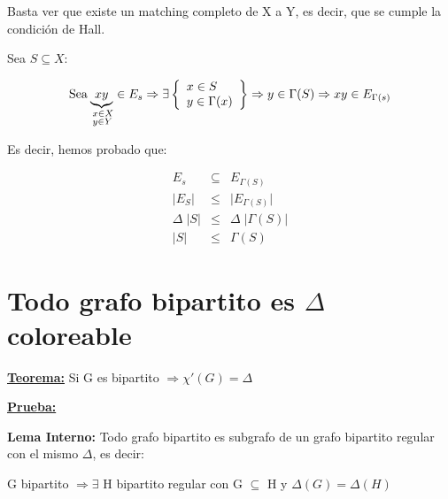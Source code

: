 \documentclass[12pt,a4paper]{report}
\begin{document}
			\vspace{3mm}
			\par Basta ver que existe un matching completo de X a Y, es decir, que se cumple la condición de Hall.

			\vspace{5mm}
			\par Sea $S \subseteq X$:

			\begin{equation*}
				\text{Sea}
				\underbrace{xy}_{\begin{subarray}{l} \; x \in X \\
				\; y \in Y \end{subarray}} \in E_{s} \Rightarrow
				{\Huge \exists}
	  		\left\lbrace
	  		\begin{array}{l}
	    			x \in S \\
	     		  y \in \Gamma(x) \\
	  		\end{array}
	 			\right\rbrace
	 			\Rightarrow y \in \Gamma(S) \Rightarrow xy \in E_{\Gamma(s)}
			\end{equation*}

			\vspace{3mm}
			\par Es decir, hemos probado que:

			\begin{eqnarray}
				\nonumber E_{s} &\subseteq & E_{\Gamma(S)} \\
				\nonumber \lvert E_{S} \rvert &\leq & \lvert E_{\Gamma(S)} \rvert \\
				\nonumber \Delta \; \lvert S \rvert &\leq & \Delta \; \lvert \Gamma(S) \rvert \\
				\nonumber \lvert S \rvert &\leq & \Gamma(S)
			\end{eqnarray}


	\section{Todo grafo bipartito es $\Delta$ coloreable}
		\textbf{\underline{Teorema:}} Si G es bipartito $\Rightarrow \chi '(G) = \Delta $

		\textbf{\underline{Prueba:}}

			\vspace{3mm}
			\textbf{Lema Interno:} Todo grafo bipartito es subgrafo de un grafo bipartito regular con el mismo $\Delta$, es decir:
				\begin{center}
					G bipartito $\Rightarrow \exists$ H bipartito regular con G $\subseteq$ H y $\Delta(G) = \Delta(H)$
				\end{center}
\end{document}
